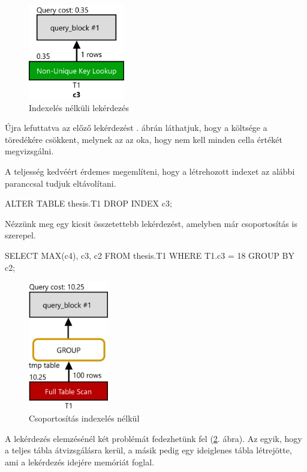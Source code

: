 \begin{figure}[h!]
\centering
\includegraphics[width=4.2cm]{images/explain/1-2.png}
\caption{Indexelés nélküli lekérdezés}
\label{fig:explain_1_2}
\end{figure}
Újra lefuttatva az előző lekérdezést . ábrán láthatjuk, hogy a költsége a töredékére csökkent, melynek az az oka, hogy nem kell minden cella értékét megvizsgálni.

A teljesség kedvéért érdemes megemlíteni, hogy a létrehozott indexet az alábbi paranccsal tudjuk eltávolítani.
\begin{python} 
ALTER TABLE thesis.T1 DROP INDEX c3;
\end{python}

\newpage


Nézzünk meg egy kicsit összetettebb lekérdezést, amelyben már csoportosítás is szerepel.
\begin{python} 
SELECT MAX(c4), c3, c2 FROM thesis.T1 WHERE T1.c3 = 18 GROUP BY c2;
\end{python}

\begin{figure}[h!]
\centering
\includegraphics[width=3.5cm]{images/explain/2-1.png}
\caption{Csoportosítás indexelés nélkül}
\label{fig:explain_2_1}
\end{figure}

A lekérdezés elemzésénél két problémát fedezhetünk fel (\ref{fig:explain_2_1}. ábra). Az egyik, hogy a teljes tábla átvizsgálásra kerül, a másik pedig egy ideiglenes tábla létrejötte, ami a lekérdezés idejére memóriát foglal.

